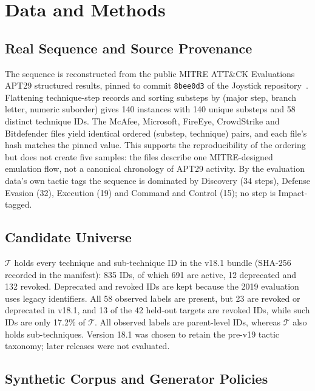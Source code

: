 \documentclass[conference]{IEEEtran}
\begin{document}
\section{Data and Methods}

\subsection{Real Sequence and Source Provenance}

The sequence is reconstructed from the public MITRE ATT\&CK Evaluations APT29 structured results, pinned to commit \texttt{8bee0d3} of the Joystick repository~\cite{mitre_joystick,mitre_apt29}. Flattening technique-step records and sorting substeps by (major step, branch letter, numeric suborder) gives 140 instances with 140 unique substeps and 58 distinct technique IDs. The McAfee, Microsoft, FireEye, CrowdStrike and Bitdefender files yield identical ordered (substep, technique) pairs, and each file's hash matches the pinned value. This supports the reproducibility of the ordering but does not create five samples: the files describe one MITRE-designed emulation flow, not a canonical chronology of APT29 activity. By the evaluation data's own tactic tags the sequence is dominated by Discovery (34 steps), Defense Evasion (32), Execution (19) and Command and Control (15); no step is Impact-tagged.

\subsection{Candidate Universe}

$\mathcal{T}$ holds every technique and sub-technique ID in the v18.1 bundle (SHA-256 recorded in the manifest): 835 IDs, of which 691 are active, 12 deprecated and 132 revoked. Deprecated and revoked IDs are kept because the 2019 evaluation uses legacy identifiers. All 58 observed labels are present, but 23 are revoked or deprecated in v18.1, and 13 of the 42 held-out targets are revoked IDs, while such IDs are only 17.2\% of $\mathcal{T}$. All observed labels are parent-level IDs, whereas $\mathcal{T}$ also holds sub-techniques. Version 18.1 was chosen to retain the pre-v19 tactic taxonomy; later releases were not evaluated.

\subsection{Synthetic Corpus and Generator Policies}
\end{document}
